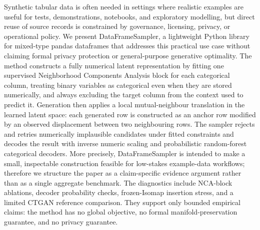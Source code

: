 Synthetic tabular data is often needed in settings where realistic examples are
useful for tests, demonstrations, notebooks, and exploratory modelling, but
direct reuse of source records is constrained by governance, licensing, privacy,
or operational policy. We present DataFrameSampler, a lightweight Python
library for mixed-type pandas dataframes that addresses this practical use case
without claiming formal privacy protection or general-purpose generative
optimality. The method constructs a fully numerical latent representation by
fitting one supervised Neighborhood Components Analysis block for each
categorical column, treating binary variables as categorical even when they are
stored numerically, and always excluding the target column from the context used
to predict it. Generation then applies a local mutual-neighbour translation in
the learned latent space: each generated row is constructed as an anchor row
modified by an observed displacement between two neighbouring rows. The sampler
rejects and retries numerically implausible candidates under fitted constraints
and decodes the result with inverse numeric scaling and probabilistic
random-forest categorical decoders. More
precisely, DataFrameSampler is intended to make a small, inspectable
construction feasible for low-stakes example-data workflows; therefore we
structure the paper as a claim-specific evidence argument rather than as a
single aggregate benchmark. The diagnostics include NCA-block ablations,
decoder probability checks, frozen-Isomap insertion stress, and a limited CTGAN
reference comparison. They support only bounded empirical claims: the method
has no global objective, no formal manifold-preservation guarantee, and no
privacy guarantee.
